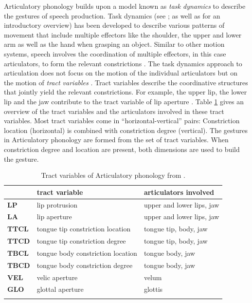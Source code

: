 Articulatory phonology builds upon a model known as \emph{task dynamics} to describe the gestures of speech production. Task dynamics (see \citealp{Saltzman1986, SaltzmanKelso1987, Saltzman1991}; as well as \citealp{Hawkins1992} for an introductory overview) has been developed to describe various patterns of movement that include multiple effectors like the shoulder, the upper and lower arm as well as the hand when grasping an object. Similar to other motion systems, speech involves the coordination of multiple effectors, in this case articulators, to form the relevant constrictions \citep{BrowmanGoldstein1989}. The task dynamics approach to articulation does not focus on the motion of the individual articulators but on the motion of \emph{tract variables} \citep{BrowmanGoldstein1992}. Tract variables describe the coordinative structures that jointly yield the relevant constrictions. For example, the upper lip, the lower lip and the jaw contribute to the tract variable of lip aperture \citep{BrowmanGoldstein1992}. Table \ref{tab:tract_vars} gives an overview of the tract variables and the articulators involved in these tract variables. Most tract variables come in “horizontal-vertical” pairs: Constriction location (horizontal) is combined with constriction degree (vertical). The gestures in Articulatory phonology are formed from the set of tract variables. When constriction degree and location are present, both dimensions are used to build the gesture.

\begin{table}
\caption{Tract variables of Articulatory phonology from \citet[73]{BrowmanGoldstein1989}.}
\begin{tabularx}{\textwidth}{Xll}
	\lsptoprule
&			\textbf{tract variable} &			\textbf{articulators involved}\\
\midrule
\textbf{LP} &		lip protrusion &				upper and lower lips, jaw\\
\textbf{LA} &		lip aperture &				upper and lower lips, jaw\\
\textbf{TTCL} &	tongue tip constriction location &	tongue tip, body, jaw \\
\textbf{TTCD} &	tongue tip constriction degree &		tongue tip, body, jaw \\
\textbf{TBCL} &	tongue body constriction location &	tongue body, jaw \\
\textbf{TBCD} &	tongue body constriction degree &	tongue body, jaw \\
\textbf{VEL} &	velic aperture &				velum \\
\textbf{GLO} &	glottal aperture &				glottis \\
  \lspbottomrule
\end{tabularx}
\label{tab:tract_vars}
\end{table}%

